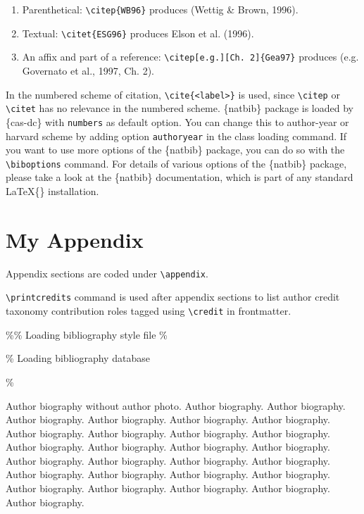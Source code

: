 \documentclass[]{elsarticle} %
\begin{document}
\begin{enumerate}[\textbullet]
\item Parenthetical: \verb+\citep{WB96}+ produces (Wettig \& Brown, 1996).
\item Textual: \verb+\citet{ESG96}+ produces Elson et al. (1996).
\item An affix and part of a reference:\break
\verb+\citep[e.g.][Ch. 2]{Gea97}+ produces (e.g. Governato et
al., 1997, Ch. 2).
\end{enumerate}

In the numbered scheme of citation, \verb+\cite{<label>}+ is used, since
\verb+\citep+ or \verb+\citet+ has no relevance in the numbered scheme.
\{natbib\} package is loaded by \{cas-dc\} with \verb+numbers+ as
default option. You can change this to author-year or harvard scheme by
adding option \verb+authoryear+ in the class loading command. If you
want to use more options of the \{natbib\} package, you can do so with
the \verb+\biboptions+ command. For details of various options of the
\{natbib\} package, please take a look at the \{natbib\} documentation,
which is part of any standard \LaTeX\{\} installation.

\appendix
\section{My Appendix}

Appendix sections are coded under \verb+\appendix+.

\verb+\printcredits+ command is used after appendix sections to list
author credit taxonomy contribution roles tagged using \verb+\credit+ in
frontmatter.

\printcredits

\%\% Loading bibliography style file \%




\% Loading bibliography database



\%\vskip3pt

\bio{}

Author biography without author photo. Author biography. Author
biography. Author biography. Author biography. Author biography. Author
biography. Author biography. Author biography. Author biography. Author
biography. Author biography. Author biography. Author biography. Author
biography. Author biography. Author biography. Author biography. Author
biography. Author biography. Author biography. Author biography. Author
biography. Author biography. Author biography. Author biography. Author
biography. Author biography. \endbio
\end{document}
